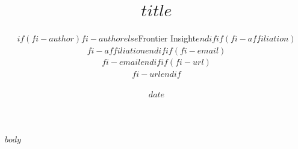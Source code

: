 \documentclass[12pt,a4paper]{article}
\title{$title$}
\author{$if(fi-author)$$fi-author$$else$Frontier Insight$endif$$if(fi-affiliation)$\\{\small $fi-affiliation$}$endif$$if(fi-email)$\\{\small $fi-email$}$endif$$if(fi-url)$\\{\small $fi-url$}$endif$}
\date{$date$}
\begin{document}
\maketitle

$body$
\end{document}
